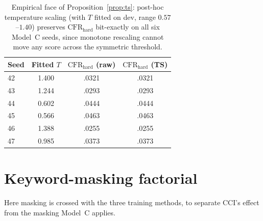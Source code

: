 \documentclass[11pt]{article}
\newcommand{\CFRh}{\ensuremath{\mathrm{CFR}_{\mathrm{hard}}}\xspace}
\begin{document}
\begin{table}[htbp]
\centering
\small
{}
\caption{Per-seed 15-bin ECE and recall for Model~C and CCI (DeBERTa-v3-base); each method's two largest ECE values are bold. Both methods show substantial calibration variation across seeds, and each one's worst-calibrated seed is also its highest-recall seed. Checkpoints were selected by development macro-$F_1$. Six seeds cannot establish bimodality or attribute the spread to the stopping rule.}
\label{tab:app_bimodal}
\end{table}

\begin{table}[htbp]
\centering
\small
\begin{tabular}{@{}lccc@{}}
\toprule
Seed & Fitted $T$ & $\CFRh$ (raw) & $\CFRh$ (TS) \\
\midrule
42 & 1.400 & .0321 & .0321 \\
43 & 1.244 & .0293 & .0293 \\
44 & 0.602 & .0444 & .0444 \\
45 & 0.566 & .0463 & .0463 \\
46 & 1.388 & .0255 & .0255 \\
47 & 0.985 & .0373 & .0373 \\
\bottomrule
\end{tabular}
\caption{Empirical face of Proposition~\ref{prop:ts}: post-hoc temperature scaling (with $T$ fitted on dev, range $0.57$--$1.40$) preserves $\CFRh$ bit-exactly on all six Model~C seeds, since monotone rescaling cannot move any score across the symmetric threshold.}
\label{tab:app_ts}
\end{table}

\FloatBarrier
\section{Keyword-masking factorial}
\label{app:factorial}
Here masking is crossed with the three training methods, to separate CCI's effect from the masking Model~C applies.
\end{document}
